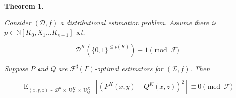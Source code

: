 \documentclass{article}
\numberwithin{equation}{section}
\theoremstyle{definition}
\theoremstyle{plain}
\newtheorem{theorem}{Theorem}[section]
\newcommand{\Bool}{\{0,1\}}
\DeclareMathOperator{\E}{E}
\DeclareMathOperator{\Un}{U}
\newcommand{\Nats}{\mathbb{N}}
\newcommand{\NatPoly}{\Nats[K_0, K_1 \ldots K_{n-1}]}
\newcommand{\Dist}{\mathcal{D}}
\newcommand{\Fall}{\mathcal{F}}
\newcommand{\ESG}{\Fall^\sharp(\Gamma)}
\begin{document}
\begin{samepage}
\begin{theorem}
\label{thm:uniq}

Consider ${(\Dist,f)}$ a distributional estimation problem. Assume there is\\ ${p \in \NatPoly}$ s.t. 

\begin{equation}
\label{eqn:thm__uniq__dist}
\Dist^K(\Bool^{\leq p(K)}) \equiv 1 \pmod \Fall
\end{equation}

Suppose ${P}$ and ${Q}$ are ${\ESG}$-optimal estimators for ${(\Dist,f)}$. Then

\begin{equation}
\label{eqn:thm__uniq}
\E_{(x,y,z) \sim \Dist^K \times \Un_P^K \times \Un_Q^K}[(P^K(x,y)-Q^K(x,z))^2] \equiv 0 \pmod \Fall
\end{equation}

\end{theorem}
\end{samepage}
\end{document}
